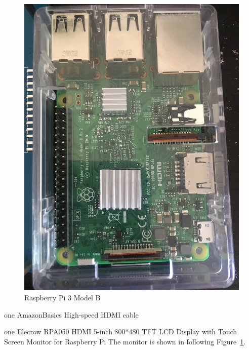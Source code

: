 \begin{figure}[!ht]
  \centering\includegraphics[width=\columnwidth]{images/pi.jpeg}
  \caption{Raspberry Pi 3 Model B}\label{f:fly}
\end{figure}


one AmazonBasics High-speed HDMI cable

one Elecrow RPA050 HDMI 5-inch 800*480 TFT LCD Display with Touch
 Screen Monitor for Raspberry Pi
 The monitor is shown in following Figure~\ref{f:fly}.


